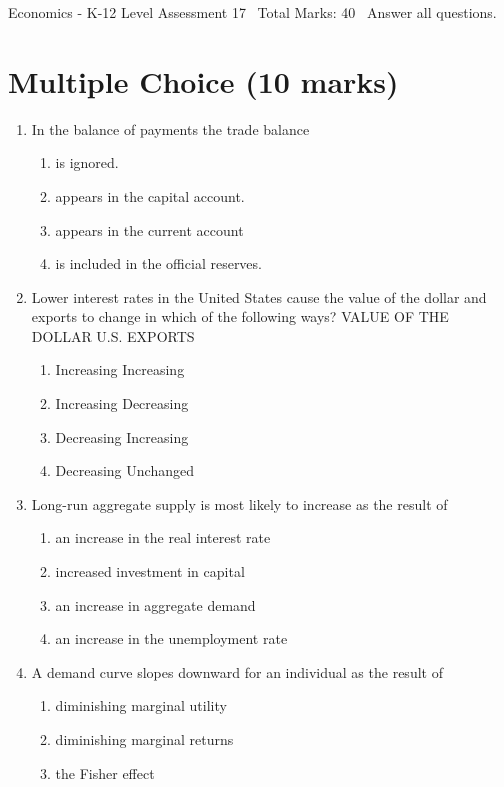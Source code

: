 \documentclass[12pt]{article}
\begin{document}
\begin{center}
Economics - K-12 Level Assessment 17 \
Total Marks: 40 \
Answer all questions.
\end{center}

\section*{Multiple Choice (10 marks)}
\begin{enumerate}[label=\arabic*.]
\item In the balance of payments the trade balance
\begin{enumerate}[label=(\alph*)]
    \item is ignored.
    \item appears in the capital account.
    \item appears in the current account
    \item is included in the official reserves.
\end{enumerate}
\item Lower interest rates in the United States cause the value of the dollar and exports to change in which of the following ways? VALUE OF THE DOLLAR U.S. EXPORTS
\begin{enumerate}[label=(\alph*)]
    \item Increasing Increasing
    \item Increasing Decreasing
    \item Decreasing Increasing
    \item Decreasing Unchanged
\end{enumerate}
\item Long-run aggregate supply is most likely to increase as the result of
\begin{enumerate}[label=(\alph*)]
    \item an increase in the real interest rate
    \item increased investment in capital
    \item an increase in aggregate demand
    \item an increase in the unemployment rate
\end{enumerate}
\item A demand curve slopes downward for an individual as the result of
\begin{enumerate}[label=(\alph*)]
    \item diminishing marginal utility
    \item diminishing marginal returns
    \item the Fisher effect

\end{enumerate}
\end{enumerate}
\end{document}
